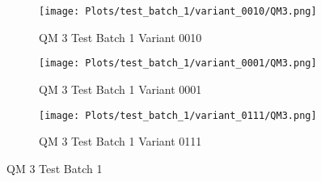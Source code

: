 \documentclass{DissertateFigs}
\begin{document}
\begin{figure}[t!]
\medskip

    \begin{subfigure}{0.47\textwidth}
    \texttt{[image: Plots/test\_batch\_1/variant\_0010/QM3.png]}
    \caption{QM 3 Test Batch 1 Variant 0010}
    \end{subfigure}
    \begin{subfigure}{0.47\textwidth}
    \texttt{[image: Plots/test\_batch\_1/variant\_0001/QM3.png]}
    \caption{QM 3 Test Batch 1 Variant 0001}
    \end{subfigure}

\medskip

    \begin{subfigure}{0.47\textwidth}
    \texttt{[image: Plots/test\_batch\_1/variant\_0111/QM3.png]}
    \caption{QM 3 Test Batch 1 Variant 0111}
    \end{subfigure}
\caption{QM 3 Test Batch 1}
    \end{figure}
\clearpage
\end{document}
